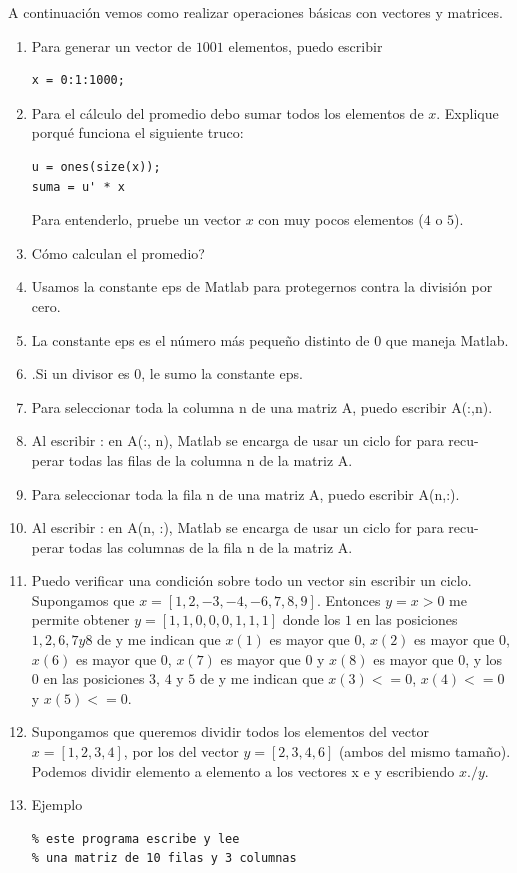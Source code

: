 A continuaci\'{o}n vemos como realizar operaciones b\'{a}sicas con vectores y matrices.
\begin{enumerate}

\item Para generar un vector de $1001$ elementos, puedo escribir
\begin{verbatim}
x = 0:1:1000;
\end{verbatim}

\item Para el c\'{a}lculo del promedio debo sumar todos los elementos de
$x$. Explique porqu\'{e} funciona el siguiente truco:
\begin{verbatim}
u = ones(size(x));
suma = u' * x
\end{verbatim}
Para entenderlo, pruebe un vector $x$ con muy pocos elementos ($4$ o
$5$).

\item \textquestiondown C\'{o}mo calculan el promedio?

\item Usamos la constante eps de Matlab para protegernos contra la
  divisi\'{o}n  por cero.
\item La constante eps es el n\'{u}mero m\'{a}s peque\~{n}o distinto de $0$ que maneja
   Matlab.
\item.Si un divisor es $0$, le sumo la constante eps.
\item Para seleccionar toda la columna n de una matriz A, puedo escribir A(:,n).
\item Al escribir : en A(:, n), Matlab se encarga de usar un ciclo for para recu-
    perar todas las filas de la columna n de la matriz A.
\item Para seleccionar toda la fila n de una matriz A, puedo escribir A(n,:).
\item Al escribir : en A(n, :), Matlab se encarga de usar un ciclo for para recu-
    perar todas las columnas de la fila n de la matriz A.
\item Puedo verificar una condici\'{o}n sobre todo un vector sin escribir un ciclo.
    Supongamos que $x = [1, 2, -3, -4, -6, 7, 8, 9]$. Entonces $y = x > 0$ me
    permite obtener $y = [1, 1, 0, 0, 0, 1, 1, 1]$ donde los $1$ en las posiciones $1, 2,
    6, 7 y 8$ de y me indican que $x(1)$ es mayor que $0$, $x(2)$ es mayor que $0$,
    $x(6)$ es mayor que $0$, $x(7)$ es mayor que $0$ y $x(8)$ es mayor que $0$, y los $0$
    en las posiciones $3$, $4$ y $5$ de y me indican que $x(3) <= 0$, $x(4) <= 0$ y
    $x(5) <= 0$.
\item Supongamos que queremos dividir todos los elementos del vector $x =
    [1, 2, 3, 4]$, por los del vector $y = [2, 3, 4, 6]$ (ambos del mismo tama\~{n}o).
    Podemos dividir elemento a elemento a los vectores x e y escribiendo $x./y$.
\item Ejemplo
\begin{verbatim}
% este programa escribe y lee 
% una matriz de 10 filas y 3 columnas


\end{verbatim}
\end{enumerate}

